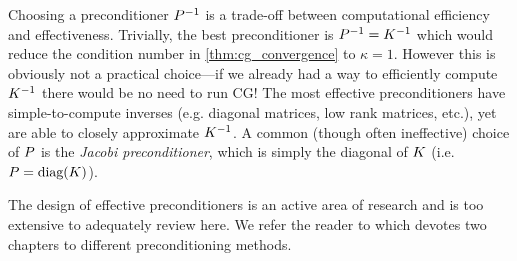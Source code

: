 

Choosing a preconditioner $P^{-1}$ is a trade-off between computational efficiency and effectiveness.
Trivially, the best preconditioner is $P^{-1} = K^{-1}$ which would reduce the condition number in \cref{thm:cg_convergence} to $\kappa = 1$.
However this is obviously not a practical choice---if we already had a way to efficiently compute $K^{-1}$ there would be no need to run CG!
The most effective preconditioners have simple-to-compute inverses (e.g. diagonal matrices, low rank matrices, etc.), yet are able to closely approximate $K^{-1}$.
A common (though often ineffective) choice of $P$ is the \emph{Jacobi preconditioner}, which is simply the diagonal of $K$ (i.e. $P = \text{diag}(K)$).

The design of effective preconditioners is an active area of research and is too extensive to adequately review here.
We refer the reader to \cite{saad2003iterative} which devotes two chapters to different preconditioning methods.



